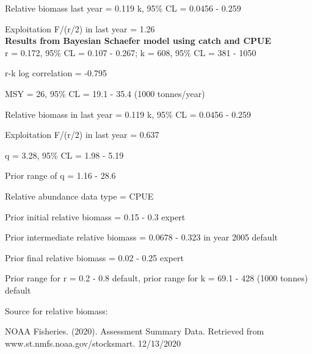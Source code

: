 \documentclass[12pt,a4paper]{article}\usepackage[]{graphicx}\usepackage[]{xcolor}
\begin{document}
Relative biomass last year = 0.119 k, 95\% CL = 0.0456 - 0.259

Exploitation F/(r/2) in last year = 1.26 \\

\textbf{Results from Bayesian Schaefer model using catch and CPUE}\\

r = 0.172, 95\% CL = 0.107 - 0.267; k = 608, 95\% CL = 381 - 1050

r-k log correlation = -0.795

MSY = 26, 95\% CL = 19.1 - 35.4 (1000 tonnes/year)

Relative biomass in last year = 0.119 k, 95\% CL = 0.0456 - 0.259

Exploitation F/(r/2) in last year = 0.637

q = 3.28, 95\% CL = 1.98 - 5.19

Prior range of q = 1.16 - 28.6

Relative abundance data type = CPUE

Prior initial relative biomass = 0.15 - 0.3 expert

Prior intermediate relative biomass = 0.0678 - 0.323 in year 2005 default

Prior final relative biomass = 0.02 - 0.25 expert

Prior range for r = 0.2 - 0.8 default, prior range for k = 69.1 - 428 (1000 tonnes) default

Source for relative biomass: 

NOAA Fisheries. (2020). Assessment Summary Data. Retrieved from www.st.nmfs.noaa.gov/stocksmart. 12/13/2020

    
\end{document}
